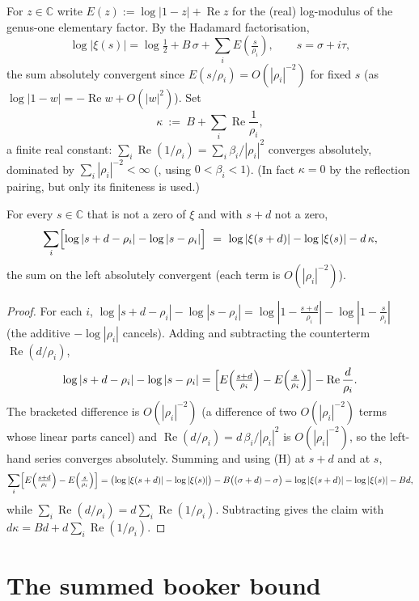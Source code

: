 For $z\in\mathbb C$ write $E(z):=\log|1-z|+\operatorname{Re}z$ for the (real) log-modulus
of the genus-one elementary factor. By the Hadamard factorisation,
\[
  \log|\xi(s)|=\log\tfrac12+B\,\sigma+\sum_i E\!\left(\tfrac s{\rho_i}\right),
  \qquad s=\sigma+i\tau,
\tag{H}
\]
the sum absolutely convergent since $E(s/\rho_i)=O(|\rho_i|^{-2})$ for fixed $s$
(as $\log|1-w|=-\operatorname{Re}w+O(|w|^2)$). Set
\[
  \kappa\ :=\ B+\sum_i\operatorname{Re}\frac1{\rho_i},
\]
a finite real constant: $\sum_i\operatorname{Re}(1/\rho_i)=\sum_i\beta_i/|\rho_i|^2$
converges absolutely, dominated by $\sum_i|\rho_i|^{-2}<\infty$ (,
using $0<\beta_i<1$). (In fact $\kappa=0$ by the reflection pairing, but only its
finiteness is used.)

\begin{lemma}
\label{lem:ll_logabs_diff}
\leanok
{}
For every $s\in\mathbb C$ that is not a zero of $\xi$ and with $s+d$ not a zero,
\[
  \sum_i\Bigl[\log|s+d-\rho_i|-\log|s-\rho_i|\Bigr]
  \ =\ \log|\xi(s+d)|-\log|\xi(s)|-d\,\kappa,
\]
the sum on the left absolutely convergent (each term is $O(|\rho_i|^{-2})$).
\end{lemma}

\begin{proof}
\leanok
{}
For each $i$, $\log|s+d-\rho_i|-\log|s-\rho_i|
=\log|1-\tfrac{s+d}{\rho_i}|-\log|1-\tfrac s{\rho_i}|$ (the additive $-\log|\rho_i|$
cancels). Adding and subtracting the counterterm $\operatorname{Re}(d/\rho_i)$,
\[
  \log|s+d-\rho_i|-\log|s-\rho_i|
  =\Bigl[E\!\left(\tfrac{s+d}{\rho_i}\right)-E\!\left(\tfrac s{\rho_i}\right)\Bigr]
   -\operatorname{Re}\frac d{\rho_i}.
\]
The bracketed difference is $O(|\rho_i|^{-2})$ (a difference of two $O(|\rho_i|^{-2})$
terms whose linear parts cancel) and $\operatorname{Re}(d/\rho_i)=d\,\beta_i/|\rho_i|^2$
is $O(|\rho_i|^{-2})$, so the left-hand series converges absolutely. Summing and using
(H) at $s+d$ and at $s$,
\[
  \sum_i\Bigl[E\!\left(\tfrac{s+d}{\rho_i}\right)-E\!\left(\tfrac s{\rho_i}\right)\Bigr]
  =\bigl(\log|\xi(s+d)|-\log|\xi(s)|\bigr)-B\bigl((\sigma+d)-\sigma\bigr)
  =\log|\xi(s+d)|-\log|\xi(s)|-Bd,
\]
while $\sum_i\operatorname{Re}(d/\rho_i)=d\sum_i\operatorname{Re}(1/\rho_i)$.
Subtracting gives the claim with $d\kappa=Bd+d\sum_i\operatorname{Re}(1/\rho_i)$.
\end{proof}

\section{The summed booker bound}
\label{sec:ll_booker}

